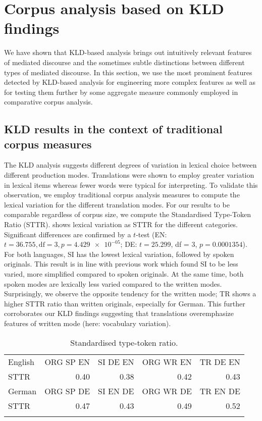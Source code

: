 \documentclass[output=paper,colorlinks,citecolor=brown]{langscibook}
\begin{document}
\section{Corpus analysis based on KLD findings}\label{analysis}

We have shown that KLD-based analysis brings out intuitively relevant features of mediated discourse and the sometimes subtle distinctions between different types of mediated discourse. In this section, we use the most prominent features detected by KLD-based analysis for engineering more complex features as well as for testing them further by some aggregate measure commonly employed in comparative corpus analysis.


\subsection{KLD results in the context of traditional corpus measures}


The KLD analysis suggests different degrees of variation in lexical choice between different production modes. Translations were shown to employ greater variation in lexical items whereas fewer words were typical for interpreting. To validate this observation, we employ traditional corpus analysis measures to compute the lexical variation for the different translation modes. For our results to be comparable regardless of corpus size, we compute the Standardised Type-Token Ratio (STTR).  shows lexical variation as STTR  for the different categories. Significant differences are confirmed by a $t$-test (EN: $t = 36.755,\allowbreak \text{df} = 3,\allowbreak p = \num{4.429e-05}$; DE: $t = 25.299$, df = 3, $p = 0.0001354$). For both languages, SI has the lowest lexical variation, followed by spoken originals. This result is in line with previous work which found SI to be less varied, more simplified compared to spoken originals. At the same time, both spoken modes are lexically less varied compared to the written modes.
Surprisingly, we observe the opposite tendency for the written mode; TR shows a higher STTR ratio than written originals, especially for German. This further corroborates our KLD findings suggesting that translations overemphasize features of written mode (here: vocabulary variation).

\begin{table}
\begin{tabular}{lrrrr}
\lsptoprule
English & ORG SP EN & SI DE EN & ORG WR EN & TR DE EN \\ 
STTR & 0.40  & 0.38 & 0.42 & 0.43 \\\midrule
German & ORG SP DE & SI EN DE & ORG WR DE & TR EN DE \\
STTR & 0.47 & 0.43 & 0.49 & 0.52\\
\lspbottomrule
\end{tabular}
\caption{\label{tab:STTR} Standardised type-token ratio.}
\end{table}
\end{document}
